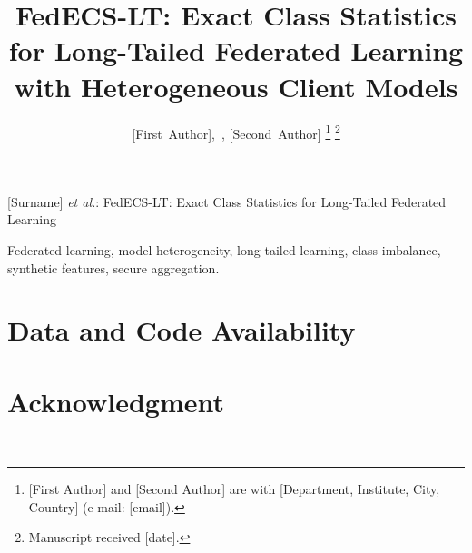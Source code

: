 \documentclass[journal]{IEEEtran}
\begin{document}
\title{FedECS-LT: Exact Class Statistics for Long-Tailed Federated Learning with Heterogeneous Client Models}

\author{[First~Author],~,
        [Second~Author]%
\thanks{[First Author] and [Second Author] are with [Department, Institute, City, Country] (e-mail: [email]).}%
\thanks{Manuscript received [date].}}

%
{[Surname] \MakeLowercase{\textit{et al.}}: FedECS-LT: Exact Class Statistics for Long-Tailed Federated Learning}

\maketitle

\begin{abstract}

\end{abstract}

\begin{IEEEkeywords}
Federated learning, model heterogeneity, long-tailed learning, class imbalance, synthetic features, secure
aggregation.
\end{IEEEkeywords}










\section*{Data and Code Availability}\label{sec:availability}
\AvailabilityText

\section*{Acknowledgment}
\AckText\ \FundingText\ \AIText




\appendices


\end{document}
